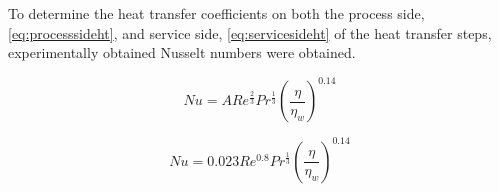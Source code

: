 To determine the heat transfer coefficients on both the process side,\ref{eq:processsideht},  and service side, \ref{eq:servicesideht} of the heat transfer steps, experimentally obtained Nusselt numbers were obtained. 



\begin{equation} \label{eq:processsideht}
    Nu = ARe^{\frac{2}{3}}Pr^{\frac{1}{3}}\left( \frac{\eta}{\eta_w} \right)^{0.14}
\end{equation}

\begin{equation} \label{eq:servicesideht}
    Nu = 0.023Re^{0.8}Pr^{\frac{1}{3}} \left( \frac{\eta}{\eta_w} \right)^{0.14}
\end{equation}



